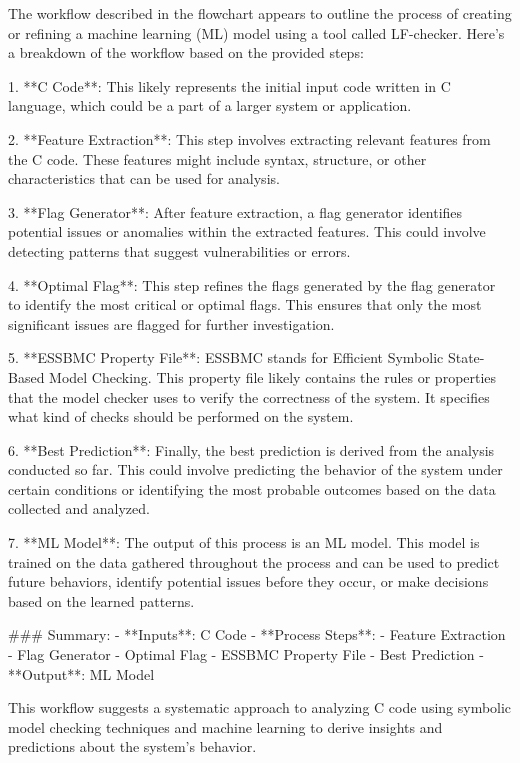The workflow described in the flowchart appears to outline the process of creating or refining a machine learning (ML) model using a tool called LF-checker. Here's a breakdown of the workflow based on the provided steps:

1. **C Code**: This likely represents the initial input code written in C language, which could be a part of a larger system or application.

2. **Feature Extraction**: This step involves extracting relevant features from the C code. These features might include syntax, structure, or other characteristics that can be used for analysis.

3. **Flag Generator**: After feature extraction, a flag generator identifies potential issues or anomalies within the extracted features. This could involve detecting patterns that suggest vulnerabilities or errors.

4. **Optimal Flag**: This step refines the flags generated by the flag generator to identify the most critical or optimal flags. This ensures that only the most significant issues are flagged for further investigation.

5. **ESSBMC Property File**: ESSBMC stands for Efficient Symbolic State-Based Model Checking. This property file likely contains the rules or properties that the model checker uses to verify the correctness of the system. It specifies what kind of checks should be performed on the system.

6. **Best Prediction**: Finally, the best prediction is derived from the analysis conducted so far. This could involve predicting the behavior of the system under certain conditions or identifying the most probable outcomes based on the data collected and analyzed.

7. **ML Model**: The output of this process is an ML model. This model is trained on the data gathered throughout the process and can be used to predict future behaviors, identify potential issues before they occur, or make decisions based on the learned patterns.

### Summary:
- **Inputs**: C Code
- **Process Steps**:
  - Feature Extraction
  - Flag Generator
  - Optimal Flag
  - ESSBMC Property File
  - Best Prediction
- **Output**: ML Model

This workflow suggests a systematic approach to analyzing C code using symbolic model checking techniques and machine learning to derive insights and predictions about the system's behavior.